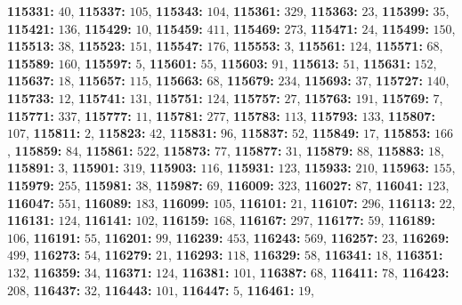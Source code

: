 \textsf{\bfseries 115331:} $40$, \textsf{\bfseries 115337:} $105$, \textsf{\bfseries 115343:} $104$, \textsf{\bfseries 115361:} $329$, \textsf{\bfseries 115363:} $23$, \textsf{\bfseries 115399:} $35$, \textsf{\bfseries 115421:} $136$, \textsf{\bfseries 115429:} $10$, \textsf{\bfseries 115459:} $411$, \textsf{\bfseries 115469:} $273$, \textsf{\bfseries 115471:} $24$, \textsf{\bfseries 115499:} $150$, \textsf{\bfseries 115513:} $38$, \textsf{\bfseries 115523:} $151$, \textsf{\bfseries 115547:} $176$, \textsf{\bfseries 115553:} $3$, \textsf{\bfseries 115561:} $124$, \textsf{\bfseries 115571:} $68$, \textsf{\bfseries 115589:} $160$, \textsf{\bfseries 115597:} $5$, \textsf{\bfseries 115601:} $55$, \textsf{\bfseries 115603:} $91$, \textsf{\bfseries 115613:} $51$, \textsf{\bfseries 115631:} $152$, \textsf{\bfseries 115637:} $18$, \textsf{\bfseries 115657:} $115$, \textsf{\bfseries 115663:} $68$, \textsf{\bfseries 115679:} $234$, \textsf{\bfseries 115693:} $37$, \textsf{\bfseries 115727:} $140$, \textsf{\bfseries 115733:} $12$, \textsf{\bfseries 115741:} $131$, \textsf{\bfseries 115751:} $124$, \textsf{\bfseries 115757:} $27$, \textsf{\bfseries 115763:} $191$, \textsf{\bfseries 115769:} $7$, \textsf{\bfseries 115771:} $337$, \textsf{\bfseries 115777:} $11$, \textsf{\bfseries 115781:} $277$, \textsf{\bfseries 115783:} $113$, \textsf{\bfseries 115793:} $133$, \textsf{\bfseries 115807:} $107$, \textsf{\bfseries 115811:} $2$, \textsf{\bfseries 115823:} $42$, \textsf{\bfseries 115831:} $96$, \textsf{\bfseries 115837:} $52$, \textsf{\bfseries 115849:} $17$, \textsf{\bfseries 115853:} $166$, \textsf{\bfseries 115859:} $84$, \textsf{\bfseries 115861:} $522$, \textsf{\bfseries 115873:} $77$, \textsf{\bfseries 115877:} $31$, \textsf{\bfseries 115879:} $88$, \textsf{\bfseries 115883:} $18$, \textsf{\bfseries 115891:} $3$, \textsf{\bfseries 115901:} $319$, \textsf{\bfseries 115903:} $116$, \textsf{\bfseries 115931:} $123$, \textsf{\bfseries 115933:} $210$, \textsf{\bfseries 115963:} $155$, \textsf{\bfseries 115979:} $255$, \textsf{\bfseries 115981:} $38$, \textsf{\bfseries 115987:} $69$, \textsf{\bfseries 116009:} $323$, \textsf{\bfseries 116027:} $87$, \textsf{\bfseries 116041:} $123$, \textsf{\bfseries 116047:} $551$, \textsf{\bfseries 116089:} $183$, \textsf{\bfseries 116099:} $105$, \textsf{\bfseries 116101:} $21$, \textsf{\bfseries 116107:} $296$, \textsf{\bfseries 116113:} $22$, \textsf{\bfseries 116131:} $124$, \textsf{\bfseries 116141:} $102$, \textsf{\bfseries 116159:} $168$, \textsf{\bfseries 116167:} $297$, \textsf{\bfseries 116177:} $59$, \textsf{\bfseries 116189:} $106$, \textsf{\bfseries 116191:} $55$, \textsf{\bfseries 116201:} $99$, \textsf{\bfseries 116239:} $453$, \textsf{\bfseries 116243:} $569$, \textsf{\bfseries 116257:} $23$, \textsf{\bfseries 116269:} $499$, \textsf{\bfseries 116273:} $54$, \textsf{\bfseries 116279:} $21$, \textsf{\bfseries 116293:} $118$, \textsf{\bfseries 116329:} $58$, \textsf{\bfseries 116341:} $18$, \textsf{\bfseries 116351:} $132$, \textsf{\bfseries 116359:} $34$, \textsf{\bfseries 116371:} $124$, \textsf{\bfseries 116381:} $101$, \textsf{\bfseries 116387:} $68$, \textsf{\bfseries 116411:} $78$, \textsf{\bfseries 116423:} $208$, \textsf{\bfseries 116437:} $32$, \textsf{\bfseries 116443:} $101$, \textsf{\bfseries 116447:} $5$, \textsf{\bfseries 116461:} $19$, 

